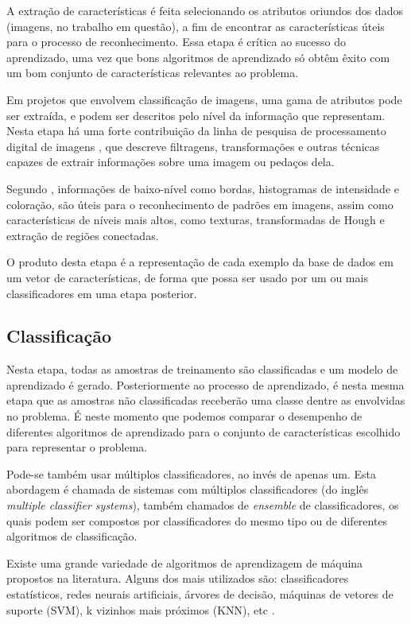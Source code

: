 A extração de características é feita selecionando os atributos oriundos dos dados (imagens, no trabalho em questão), a fim de encontrar as características úteis para o processo de reconhecimento. Essa etapa é crítica ao sucesso do aprendizado, uma vez que bons algoritmos de aprendizado só obtêm êxito com um bom conjunto de características relevantes ao problema.

Em projetos que envolvem classificação de imagens, uma gama de atributos pode ser extraída, e podem ser descritos pelo nível da informação que representam. Nesta etapa há uma forte contribuição da linha de pesquisa de processamento digital de imagens \cite{gonzalez:2002}, que descreve filtragens, transformações e outras técnicas capazes de extrair informações sobre uma imagem ou pedaços dela.

Segundo , informações de baixo-nível como bordas, histogramas de intensidade e coloração, são úteis para o reconhecimento de padrões em imagens, assim como características de níveis mais altos, como texturas, transformadas de Hough e extração de regiões conectadas.

O produto desta etapa é a representação de cada exemplo da base de dados em um vetor de características, de forma que possa ser usado por um ou mais classificadores em uma etapa posterior.


\subsection{Classificação}\label{sec:classificacao}

Nesta etapa, todas as amostras de treinamento são classificadas e um modelo de aprendizado é gerado. Posteriormente ao processo de aprendizado, é nesta mesma etapa que as amostras não classificadas receberão uma classe dentre as envolvidas no problema. É neste momento que podemos comparar o desempenho de diferentes algoritmos de aprendizado para o conjunto de características escolhido para representar o problema.

Pode-se também usar múltiplos classificadores, ao invés de apenas um. Esta abordagem é chamada de sistemas com múltiplos classificadores (do inglês \textit{multiple classifier systems}), também chamados de \textit{ensemble} de classificadores, os quais podem ser compostos por classificadores do mesmo tipo ou de diferentes algoritmos de classificação. 

Existe uma grande variedade de algoritmos de aprendizagem de máquina propostos na literatura. Alguns dos mais utilizados são: classificadores estatísticos, redes neurais artificiais, árvores de decisão, máquinas de vetores de suporte (SVM), k vizinhos mais próximos (KNN), etc \cite{jain:1989}.


